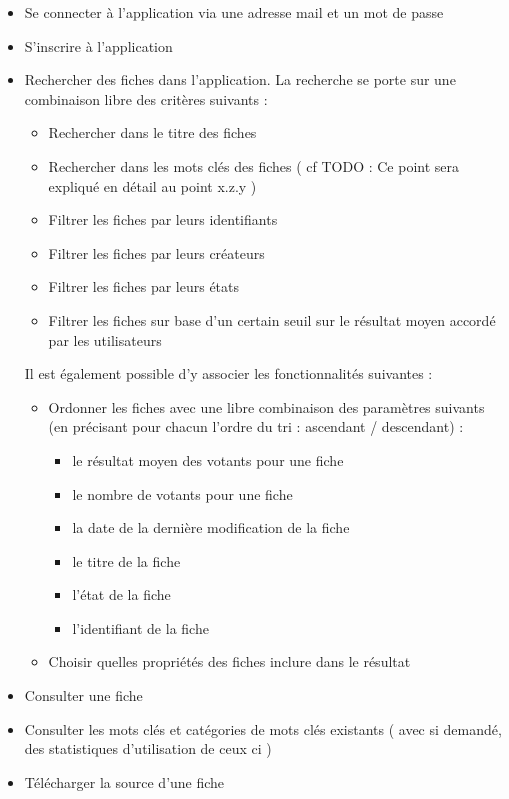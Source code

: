 \begin{itemize}
    \item Se connecter à l'application via une adresse mail et un mot de passe
    \item S'inscrire à l'application
    \item Rechercher des fiches dans l'application. La recherche se porte sur une combinaison libre des critères suivants : 
    \begin{itemize}
        \item Rechercher dans le titre des fiches
        \item Rechercher dans les mots clés des fiches ( cf TODO : Ce point sera expliqué en détail au point x.z.y )
        \item Filtrer les fiches par leurs identifiants
        \item Filtrer les fiches par leurs créateurs
        \item Filtrer les fiches par leurs états
        \item Filtrer les fiches sur base d'un certain seuil sur le résultat moyen accordé par les utilisateurs
    \end{itemize}
    Il est également possible d'y associer les fonctionnalités suivantes :
    \begin{itemize}
        \item Ordonner les fiches avec une libre combinaison des paramètres suivants (en précisant pour chacun l'ordre du tri : ascendant / descendant) :
        \begin{itemize}
            \item le résultat moyen des votants pour une fiche
            \item le nombre de votants pour une fiche
            \item la date de la dernière modification de la fiche
            \item le titre de la fiche
            \item l'état de la fiche
            \item l'identifiant de la fiche
        \end{itemize}
        \item Choisir quelles propriétés des fiches inclure dans le résultat
    \end{itemize}
    \item Consulter une fiche
    \item Consulter les mots clés et catégories de mots clés existants ( avec si demandé, des statistiques d'utilisation de ceux ci )
    \item Télécharger la source d'une fiche 
\end{itemize}


